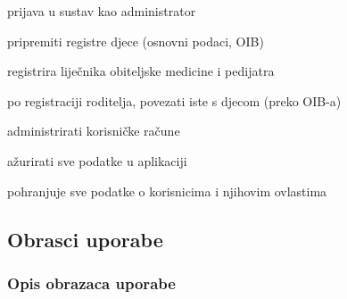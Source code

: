 \begin{packed_enum}
                \item  {}
				\begin{packed_enum}
                    \item prijava u sustav kao administrator
					\item pripremiti registre djece (osnovni podaci, OIB)
                    \item registrira liječnika obiteljske medicine i pedijatra
                    \item po registraciji roditelja, povezati iste s djecom (preko OIB-a)
					\item administrirati korisničke račune
                    \item ažurirati sve podatke u aplikaciji
				\end{packed_enum}

                \item  {}
				\begin{packed_enum}
                    \item pohranjuje sve podatke o korisnicima i njihovim ovlastima
				\end{packed_enum}
			\end{packed_enum}
			
			\eject 
				
			\subsection{Obrasci uporabe}
				
				
				\subsubsection{Opis obrazaca uporabe}
					


